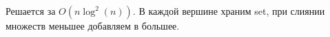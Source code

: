 Решается за $O(n \log^2(n))$. В каждой вершине храним set, при слиянии
множеств меньшее добавляем в большее.
